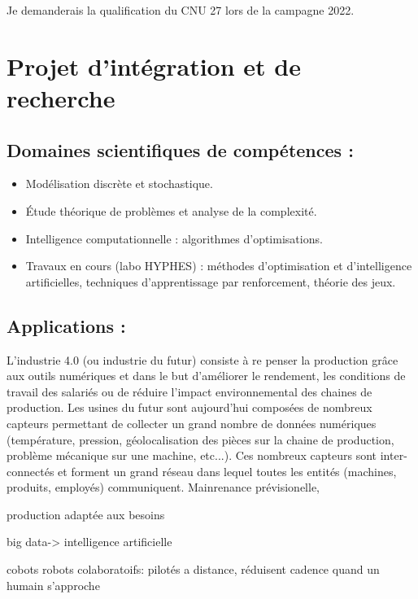 \documentclass[a4paper,10pt]{article}
\begin{document}
Je demanderais la qualification du CNU 27 lors de la campagne 2022.



\section{Projet d'intégration et de recherche}
\subsection{Domaines scientifiques de compétences :}
\begin{itemize}
\item Modélisation discrète et stochastique.
\item Étude théorique de problèmes et analyse de la complexité.
\item Intelligence computationnelle : algorithmes d'optimisations.
\item Travaux en cours (labo HYPHES) : méthodes d'optimisation et d'intelligence artificielles, techniques d'apprentissage par renforcement, théorie des jeux.
\end{itemize}
\subsection{Applications :}

L'industrie 4.0 (ou industrie du futur) consiste à re penser la production grâce aux outils numériques et dans le but d'améliorer le rendement, les conditions de travail des salariés ou de réduire l'impact environnemental des chaines de production. Les usines du futur sont aujourd'hui composées de nombreux capteurs permettant de collecter un grand nombre de données numériques   (température, pression, géolocalisation des pièces sur la chaine de production, problème mécanique sur une machine, etc...). Ces nombreux capteurs sont inter-connectés et forment un grand réseau dans lequel toutes les entités (machines, produits, employés) communiquent.
 Mainrenance prévisionelle, 
 
 production adaptée aux besoins
 
 big data-> intelligence artificielle
 
  cobots robots colaboratoifs: pilotés a distance, réduisent cadence quand un humain s'approche
\end{document}
